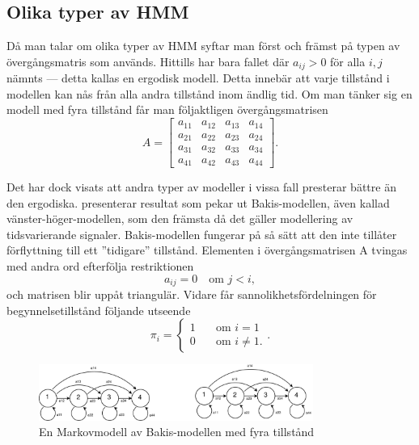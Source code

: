 \documentclass[../rapport_MVEX01-11-05]{subfiles}
\begin{document}
\subsection{Olika typer av HMM}
Då man talar om olika typer av HMM syftar man först och främst på
typen av övergångsmatris som används. Hittills har bara 
fallet där $a_{ij} > 0$ för alla $i,j$ nämnts --- detta kallas en ergodisk
modell. Detta innebär att varje tillstånd i modellen
kan nås från alla andra tillstånd inom ändlig tid. Om man
tänker sig en modell med fyra tillstånd får man följaktligen övergångsmatrisen
\begin{equation*}
A = \begin{bmatrix}
a_{11} & a_{12} & a_{13} & a_{14}\\
a_{21} & a_{22} & a_{23} & a_{24}\\
a_{31} & a_{32} & a_{33} & a_{34}\\
a_{41} & a_{42} & a_{43} & a_{44}
\end{bmatrix}.  
\end{equation*} 

Det har dock visats att andra typer av modeller i vissa fall presterar
bättre än den ergodiska. 
presenterar resultat som pekar ut Bakis-modellen, även kallad
vänster-höger-modellen, som den främsta då det gäller modellering
av tidsvarierande signaler. Bakis-modellen fungerar på så sätt att den
inte tillåter förflyttning till ett ''tidigare'' tillstånd. Elementen i
övergångsmatrisen A tvingas med andra ord efterfölja restriktionen
\begin{equation*}
a_{ij} = 0 \quad\text{om }j<i,
\end{equation*}
och matrisen blir uppåt triangulär.
Vidare får sannolikhetsfördelningen för begynnelsetillstånd följande
utseende
\begin{equation*}
\pi_i = \begin{cases}
         1 & \quad\text{om } i = 1\\
         0 & \quad\text{om } i \neq 1.\end{cases}.
\end{equation*}  

\begin{figure}[tb]
  \centering
  \includegraphics[width=0.8\textwidth,trim=0 0 1010 10,clip=true]{bilder/LR_HMM}
  \caption{En Markovmodell av Bakis-modellen med fyra tillstånd}
  \label{fig:hmm-lr}
\end{figure}
\end{document}

